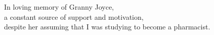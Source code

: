 \begin{dedication}
    In loving memory of Granny Joyce,\\
    a constant source of support and motivation,\\
    despite her assuming that I was studying to become a pharmacist.
\end{dedication}

